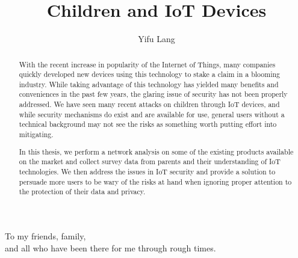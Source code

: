 \documentclass[12pt]{ucthesis}
\begin{document}

\title{Children and IoT Devices}
\author{Yifu Lang}
\deanlinethree{}

\begin{frontmatter}

\maketitle
\copyrightpage

\tableofcontents
\listoffigures
\listoftables

\begin{abstract}
With the recent increase in popularity of the Internet of Things, many companies quickly developed new devices using this technology to stake a claim in a blooming industry. While taking advantage of this technology has yielded many benefits and conveniences in the past few years, the glaring issue of security has not been properly addressed. We have seen many recent attacks on children through IoT devices, and while security mechanisms do exist and are available for use, general users without a technical background may not see the risks as something worth putting effort into mitigating. 

In this thesis, we perform a network analysis on some of the existing products available on the market and collect survey data from parents and their understanding of IoT technologies. We then address the issues in IoT security and provide a solution to persuade more users to be wary of the risks at hand when ignoring proper attention to the protection of their data and privacy. 
\end{abstract}

\begin{dedication}
\null\vfil
{\large
\begin{center}
To my friends, family,\\\vspace{12pt}
and all who have been there for me through rough times.\\\vspace{12pt}
\end{center}}
\vfil\null
\end{dedication}


\end{frontmatter}
\end{document}
